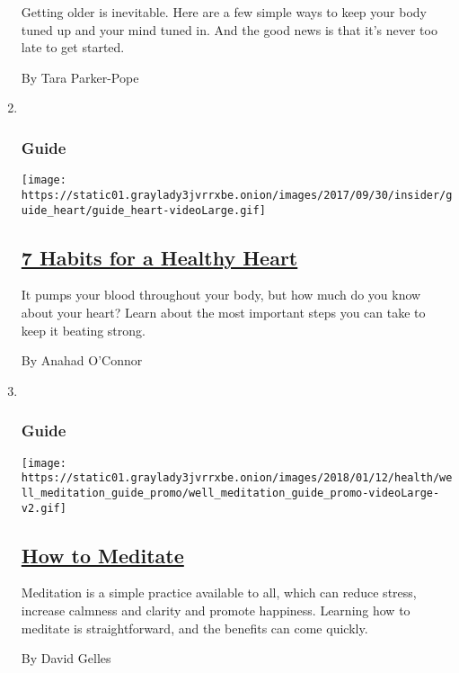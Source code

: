 \begin{enumerate}
  Getting older is inevitable. Here are a few simple ways to keep your
  body tuned up and your mind tuned in. And the good news is that it's
  never too late to get started.

  By Tara Parker-Pope
\item ~
  \hypertarget{guide-1}{%
  \subsubsection{Guide}\label{guide-1}}

  \texttt{[image: https://static01.graylady3jvrrxbe.onion/images/2017/09/30/insider/guide\_heart/guide\_heart-videoLarge.gif]}

  \hypertarget{7-habits-for-a-healthy-heart}{%
  \subsection{\texorpdfstring{\href{/interactive/2017/well/live/guide-healthy-heart.html}{7
  Habits for a Healthy
  Heart}}{7 Habits for a Healthy Heart}}\label{7-habits-for-a-healthy-heart}}

  It pumps your blood throughout your body, but how much do you know
  about your heart? Learn about the most important steps you can take to
  keep it beating strong.

  By Anahad O'Connor
\item ~
  \hypertarget{guide-2}{%
  \subsubsection{Guide}\label{guide-2}}

  \texttt{[image: https://static01.graylady3jvrrxbe.onion/images/2018/01/12/health/well\_meditation\_guide\_promo/well\_meditation\_guide\_promo-videoLarge-v2.gif]}

  \hypertarget{how-to-meditate}{%
  \subsection{\texorpdfstring{\href{/interactive/2016/well/mind/well-meditation-guide-interactive.html}{How
  to Meditate}}{How to Meditate}}\label{how-to-meditate}}

  Meditation is a simple practice available to all, which can reduce
  stress, increase calmness and clarity and promote happiness. Learning
  how to meditate is straightforward, and the benefits can come quickly.

  By David Gelles
\end{enumerate}

